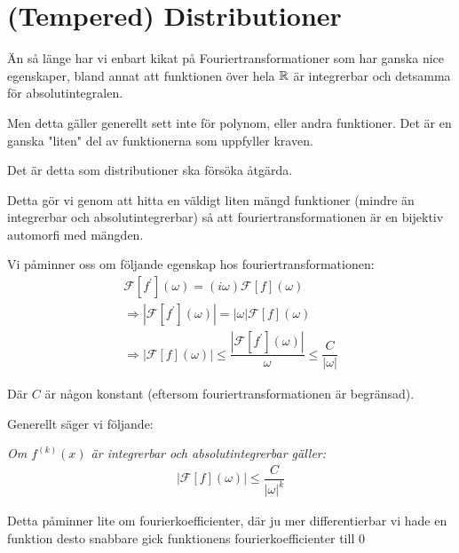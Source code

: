\section{(Tempered) Distributioner}\par
\noindent Än så länge har vi enbart kikat på Fouriertransformationer som har ganska nice egenskaper, bland annat att funktionen över hela $\mathbb{R}$ är integrerbar och detsamma för absolutintegralen.\par
\noindent Men detta gäller generellt sett inte för polynom, eller andra funktioner. Det är en ganska "liten" del av funktionerna som uppfyller kraven.
\par\bigskip
\noindent Det är detta som distributioner ska försöka åtgärda.\par
\noindent Detta gör vi genom att hitta en väldigt liten mängd funktioner (mindre än integrerbar och absolutintegrerbar) så att fouriertransformationen är en bijektiv automorfi med mängden.
\par\bigskip
\noindent Vi påminner oss om följande egenskap hos fouriertransformationen:
\begin{equation*}
  \begin{gathered}
    \mathcal{F}\left[f^{\prime}\right](\omega) = (i\omega)\mathcal{F}\left[f\right](\omega)\\
    \Rightarrow \left|\mathcal{F}\left[f^{\prime}\right](\omega)\right| = \left|\omega\right|\mathcal{F}\left[f\right](\omega)\\
    \Rightarrow\left|\mathcal{F}\left[f\right](\omega)\right| \leq \dfrac{\left|\mathcal{F}\left[f^{\prime}\right](\omega)\right|}{\omega}\leq\dfrac{C}{\left|\omega\right|}
  \end{gathered}
\end{equation*}\par
\noindent Där $C$ är någon konstant (eftersom fouriertransformationen är begränsad).
\par\bigskip
\noindent Generellt säger vi följande:\par
\textit{Om $f^{(k)}(x)$ är integrerbar och absolutintegrerbar gäller:}
\begin{equation*}
  \begin{gathered}
    \left|\mathcal{F}\left[f\right](\omega)\right|\leq\dfrac{C}{\left|\omega\right|^k}
  \end{gathered}
\end{equation*}
\par\bigskip
\noindent Detta påminner lite om fourierkoefficienter, där ju mer differentierbar vi hade en funktion desto snabbare gick funktionens fourierkoefficienter till 0\par
